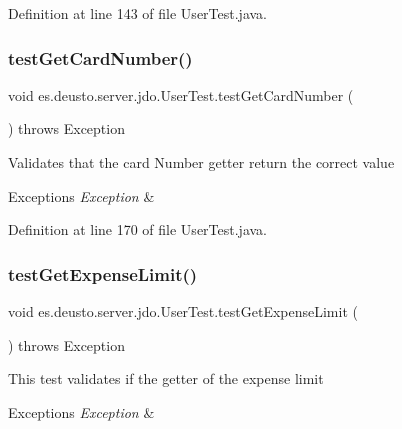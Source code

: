 Definition at line 143 of file User\+Test.\+java.

\mbox{\label{classes_1_1deusto_1_1server_1_1jdo_1_1_user_test_ad84d7265ac6d2d4a9e9f3d42e80b8baf}} 
\subsubsection{\texorpdfstring{test\+Get\+Card\+Number()}{testGetCardNumber()}}
{\footnotesize\ttfamily void es.\+deusto.\+server.\+jdo.\+User\+Test.\+test\+Get\+Card\+Number (\begin{DoxyParamCaption}{ }\end{DoxyParamCaption}) throws Exception}

Validates that the card Number getter return the correct value 
\begin{DoxyExceptions}{Exceptions}
{\em Exception} & \\
\hline
\end{DoxyExceptions}


Definition at line 170 of file User\+Test.\+java.

\mbox{\label{classes_1_1deusto_1_1server_1_1jdo_1_1_user_test_ac9953cb0f85111b005a731bc9706a3b5}} 
\subsubsection{\texorpdfstring{test\+Get\+Expense\+Limit()}{testGetExpenseLimit()}}
{\footnotesize\ttfamily void es.\+deusto.\+server.\+jdo.\+User\+Test.\+test\+Get\+Expense\+Limit (\begin{DoxyParamCaption}{ }\end{DoxyParamCaption}) throws Exception}

This test validates if the getter of the expense limit 
\begin{DoxyExceptions}{Exceptions}
{\em Exception} & \\
\hline
\end{DoxyExceptions}


